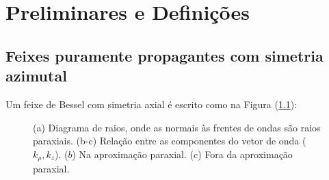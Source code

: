 \chapter{Preliminares e Defini\c{c}\~{o}es}

\section{Feixes puramente propagantes com simetria azimutal}
Um feixe de Bessel com simetria axial \'e escrito como na Figura (\ref{figz}):



\begin{figure}[ht]
\centering
{}
\caption{(a) Diagrama de raios, onde as normais às frentes de ondas são raios paraxiais. (b-c) Relação entre as componentes do vetor de onda ($k_{\rho}, k_z$). ($b$) Na aproximação paraxial. (c) Fora da aproximação paraxial.}
\label{figz}
\end{figure}

